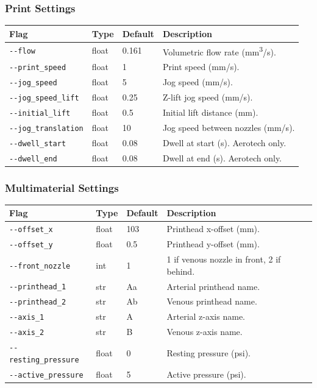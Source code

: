 \documentclass[11pt,letterpaper]{article}
\newcommand{\code}[1]{\texttt{#1}}
\begin{document}
\subsubsection{Print Settings}

\begin{tabularx}{\textwidth}{L{3.8cm} l l X}
\toprule
\textbf{Flag} & \textbf{Type} & \textbf{Default} & \textbf{Description} \\
\midrule
\code{-{}-flow} & float & 0.161 & Volumetric flow rate (mm\textsuperscript{3}/s). \\
\code{-{}-print\_speed} & float & 1 & Print speed (mm/s). \\
\code{-{}-jog\_speed} & float & 5 & Jog speed (mm/s). \\
\code{-{}-jog\_speed\_lift} & float & 0.25 & Z-lift jog speed (mm/s). \\
\code{-{}-initial\_lift} & float & 0.5 & Initial lift distance (mm). \\
\code{-{}-jog\_translation} & float & 10 & Jog speed between nozzles (mm/s). \\
\code{-{}-dwell\_start} & float & 0.08 & Dwell at start (s). Aerotech only. \\
\code{-{}-dwell\_end} & float & 0.08 & Dwell at end (s). Aerotech only. \\
\bottomrule
\end{tabularx}

\subsubsection{Multimaterial Settings}

\begin{tabularx}{\textwidth}{L{3.8cm} l l X}
\toprule
\textbf{Flag} & \textbf{Type} & \textbf{Default} & \textbf{Description} \\
\midrule
\code{-{}-offset\_x} & float & 103 & Printhead x-offset (mm). \\
\code{-{}-offset\_y} & float & 0.5 & Printhead y-offset (mm). \\
\code{-{}-front\_nozzle} & int & 1 & 1 if venous nozzle in front, 2 if behind. \\
\code{-{}-printhead\_1} & str & Aa & Arterial printhead name. \\
\code{-{}-printhead\_2} & str & Ab & Venous printhead name. \\
\code{-{}-axis\_1} & str & A & Arterial z-axis name. \\
\code{-{}-axis\_2} & str & B & Venous z-axis name. \\
\code{-{}-resting\_pressure} & float & 0 & Resting pressure (psi). \\
\code{-{}-active\_pressure} & float & 5 & Active pressure (psi). \\
\bottomrule
\end{tabularx}
\end{document}
